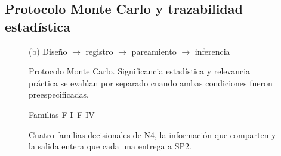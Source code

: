 %



\subsection{Protocolo Monte Carlo y trazabilidad estadística}

\begin{figure}[H]\centering
{}
{(b) Diseño $\rightarrow$ registro $\rightarrow$ pareamiento $\rightarrow$ inferencia}
\caption{Protocolo Monte Carlo. Significancia estadística y relevancia práctica se
evalúan por separado cuando ambas condiciones fueron preespecificadas.}
\viuownsource
\end{figure}





\begin{figure}[H]\centering
{}
{Familias F-I--F-IV}
\caption{Cuatro familias decisionales de N4, la información que comparten y la
salida entera que cada una entrega a SP2.}
\viuownsource
\end{figure}


